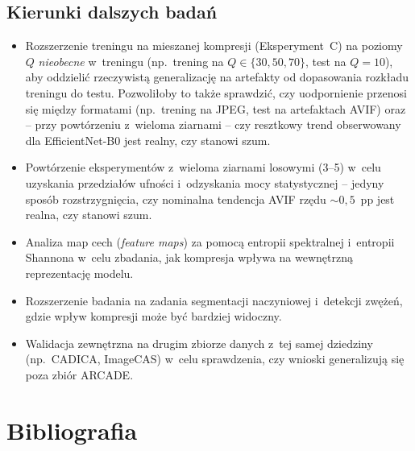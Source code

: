 \documentclass[12pt,a4paper]{article}
\begin{document}
\subsection{Kierunki dalszych badań}

\begin{itemize}
    \item Rozszerzenie treningu na mieszanej kompresji (Eksperyment~C) na poziomy~$Q$ \emph{nieobecne} w~treningu (np.~trening na $Q \in \{30, 50, 70\}$, test na $Q=10$), aby oddzielić rzeczywistą generalizację na artefakty od dopasowania rozkładu treningu do testu. Pozwoliłoby to także sprawdzić, czy uodpornienie przenosi się między formatami (np.~trening na JPEG, test na artefaktach AVIF) oraz -- przy powtórzeniu z~wieloma ziarnami -- czy resztkowy trend obserwowany dla EfficientNet-B0 jest realny, czy stanowi szum.
    \item Powtórzenie eksperymentów z~wieloma ziarnami losowymi (3--5) w~celu uzyskania przedziałów ufności i~odzyskania mocy statystycznej -- jedyny sposób rozstrzygnięcia, czy nominalna tendencja AVIF rzędu ${\sim}0{,}5$~pp jest realna, czy stanowi szum.
    \item Analiza map cech (\textit{feature maps}) za pomocą entropii spektralnej i~entropii Shannona w~celu zbadania, jak kompresja wpływa na wewnętrzną reprezentację modelu.
    \item Rozszerzenie badania na zadania segmentacji naczyniowej i~detekcji zwężeń, gdzie wpływ kompresji może być bardziej widoczny.
    \item Walidacja zewnętrzna na drugim zbiorze danych z~tej samej dziedziny (np.~CADICA, ImageCAS) w~celu sprawdzenia, czy wnioski generalizują się poza zbiór ARCADE.
\end{itemize}

\clearpage

\listoffigures
\listoftables

\section*{Bibliografia}
\end{document}
